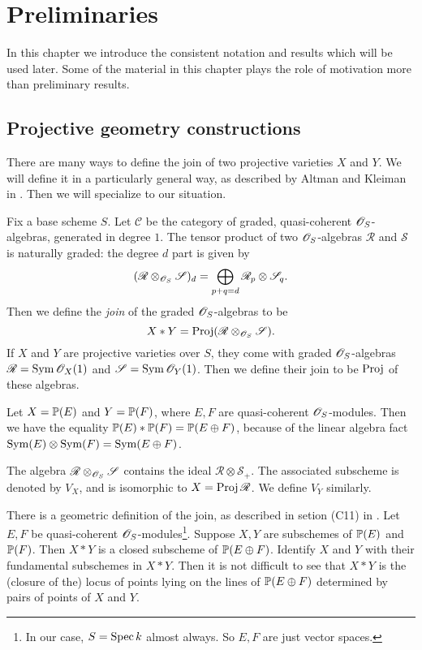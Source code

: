 \chapter{Preliminaries}
\label{sec:prelims}

In this chapter we introduce the consistent notation and results which will be used later. Some of the material in this chapter plays the role of motivation more than preliminary results.


\section{Projective geometry constructions}

There are many ways to define the join of two projective varieties $X$ and $Y$. We will define it in a particularly general way, as described by Altman and Kleiman in \cite{altman_joins}. Then we will specialize to our situation.

Fix a base scheme $S$. Let $\mathscr C$ be the category of graded, quasi-coherent $\OO_S$-algebras, generated in degree $1$. The tensor product of two $\OO_S$-algebras $\mathscr R$ and $\mathscr S$  is naturally graded: the degree $d$ part is given by
\[
(\mathscr R \otimes_{\OO_S} \mathscr S)_d = \bigoplus_{p+q=d} \mathscr R_p \otimes \mathscr S_q.
\]
Then we define the \emph{join} of the graded $\OO_S$-algebras to be
\[
X \ast Y = \Proj (\mathscr R \otimes_{\OO_S} \mathscr S).
\]
If $X$ and $Y$ are projective varieties over $S$, they come with graded $\OO_S$-algebras $\mathscr R = \Sym \OO_X(1)$ and $\mathscr S = \Sym \OO_Y(1)$. Then we define their join to be $\Proj$ of these algebras. 

\begin{example}
Let $X=\P(E)$ and $Y=\P(F)$, where $E,F$ are quasi-coherent $\OO_S$-modules. Then we have the equality $\P(E) \ast \P(F) = \P(E \oplus F)$, because of the linear algebra fact $\Sym(E) \otimes \Sym(F) = \Sym(E \oplus F)$.
\end{example}

The algebra $\mathscr R \otimes_{\OO_S} \mathscr S$ contains the ideal $\mathscr R \otimes \mathscr S_+$. The associated subscheme is denoted by $V_X$, and is isomorphic to $X = \Proj \mathscr R$. We define $V_Y$ similarly.

There is a geometric definition of the join, as described in setion (C11) in \cite{altman_joins}. Let $E,F$ be quasi-coherent $\OO_S$-modules\footnote{In our case, $S=\Spec k$ almost always. So $E,F$ are just vector spaces.}. Suppose $X,Y$ are subschemes of $\P(E)$ and $\P(F)$. Then $X\ast Y$ is a closed subscheme of $\P(E \oplus F)$. Identify $X$ and $Y$ with their fundamental subschemes in $X \ast Y$. Then it is not difficult to see that $X \ast Y$ is the (closure of the) locus of points lying on the lines of $\P(E \oplus F)$ determined by pairs of points of $X$ and $Y$. 

